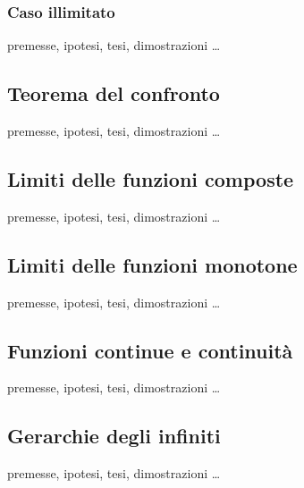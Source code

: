 \documentclass[a4paper]{article}
\begin{document}
\subsubsection*{Caso illimitato}
premesse, ipotesi, tesi, dimostrazioni \dots

\subsection{Teorema del confronto}
premesse, ipotesi, tesi, dimostrazioni \dots

\subsection{Limiti delle funzioni composte}
premesse, ipotesi, tesi, dimostrazioni \dots

\subsection{Limiti delle funzioni monotone}
premesse, ipotesi, tesi, dimostrazioni \dots

\subsection{Funzioni continue e continuità}
premesse, ipotesi, tesi, dimostrazioni \dots

\subsection{Gerarchie degli infiniti}
premesse, ipotesi, tesi, dimostrazioni \dots

\end{document}
